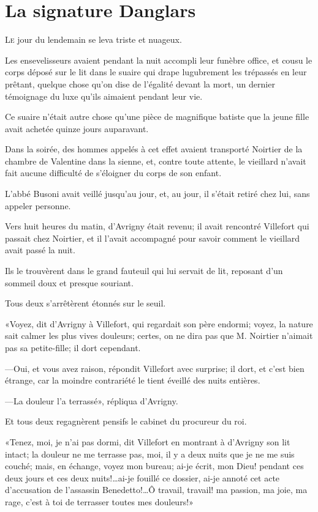 \chapter{La signature Danglars}

\lettrine{L}{e} jour du lendemain se leva triste et nuageux. 

\zz
Les ensevelisseurs avaient pendant la nuit accompli leur funèbre office, et cousu le corps déposé sur le lit dans le suaire qui drape lugubrement les trépassés en leur prêtant, quelque chose qu'on dise de l'égalité devant la mort, un dernier témoignage du luxe qu'ils aimaient pendant leur vie. 

Ce suaire n'était autre chose qu'une pièce de magnifique batiste que la jeune fille avait achetée quinze jours auparavant. 

Dans la soirée, des hommes appelés à cet effet avaient transporté Noirtier de la chambre de Valentine dans la sienne, et, contre toute attente, le vieillard n'avait fait aucune difficulté de s'éloigner du corps de son enfant. 

L'abbé Busoni avait veillé jusqu'au jour, et, au jour, il s'était retiré chez lui, sans appeler personne. 

Vers huit heures du matin, d'Avrigny était revenu; il avait rencontré Villefort qui passait chez Noirtier, et il l'avait accompagné pour savoir comment le vieillard avait passé la nuit. 

Ils le trouvèrent dans le grand fauteuil qui lui servait de lit, reposant d'un sommeil doux et presque souriant. 

Tous deux s'arrêtèrent étonnés sur le seuil. 

«Voyez, dit d'Avrigny à Villefort, qui regardait son père endormi; voyez, la nature sait calmer les plus vives douleurs; certes, on ne dira pas que M. Noirtier n'aimait pas sa petite-fille; il dort cependant. 

—Oui, et vous avez raison, répondit Villefort avec surprise; il dort, et c'est bien étrange, car la moindre contrariété le tient éveillé des nuits entières. 

—La douleur l'a terrassé», répliqua d'Avrigny. 

Et tous deux regagnèrent pensifs le cabinet du procureur du roi. 

«Tenez, moi, je n'ai pas dormi, dit Villefort en montrant à d'Avrigny son lit intact; la douleur ne me terrasse pas, moi, il y a deux nuits que je ne me suis couché; mais, en échange, voyez mon bureau; ai-je écrit, mon Dieu! pendant ces deux jours et ces deux nuits!\dots ai-je fouillé ce dossier, ai-je annoté cet acte d'accusation de l'assassin Benedetto!\dots Ô travail, travail! ma passion, ma joie, ma rage, c'est à toi de terrasser toutes mes douleurs!» 

